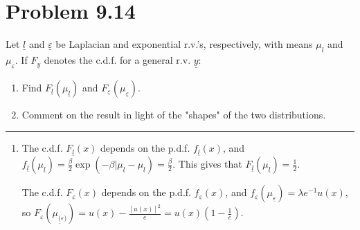 \documentclass{article}
\newcommand{\horline}
           {\begin{center}
              \noindent\rule{8cm}{0.4pt}
            \end{center}}
\begin{document}
\section*{Problem 9.14}
Let $\underline{l}$ and $\underline{\varepsilon}$ be Laplacian and 
exponential r.v.'s, respectively, with means $\mu_{\underline{l}}$ and
$\mu_{\underline{\varepsilon}}$. If $F_{\underline{y}}$ denotes the c.d.f.
for a general r.v. $\underline{y}$:
\begin{enumerate}[label=(\roman*)]
  \item{Find $F_{\underline{l}}(\mu_{\underline{l}})$ and 
        $F_{\underline{\varepsilon}}(\mu_{\underline{\varepsilon}})$.}
  \item{Comment on the result in light of the "shapes" of the two 
        distributions.}
\end{enumerate}
\horline
\begin{enumerate}[label=(\roman*)]
  \item{The c.d.f. $F_{\underline{l}}(x)$ depends on the p.d.f. 
        $f_{\underline{l}}(x)$, and $f_{\underline{l}}(\mu_{\underline{l}})
          = \frac{\beta}{2}\exp(-\beta|\mu_{\underline{l}} 
               - \mu_{\underline{l}}) = \frac{\beta}{2}.$ This gives
        that $F_{\underline{l}}(\mu_{\underline{l}}) = \frac{1}{2}$.
  
        The c.d.f. $F_{\underline{\varepsilon}}(x)$ depends on the p.d.f.
        $f_{\underline{\varepsilon}}(x)$, and 
        $f_{\underline{\varepsilon}}(\mu_{\underline{\varepsilon}}) =
          \lambda e^{-1} u(x)$, so 
        $F_{\underline{\varepsilon}}(\mu_{\underline(\varepsilon)}) =
          u(x) - \frac{[u(x)]^2}{e} = u(x)\left(1 - \frac{1}{e}\right)$.
       }
\end{enumerate}
\end{document}
